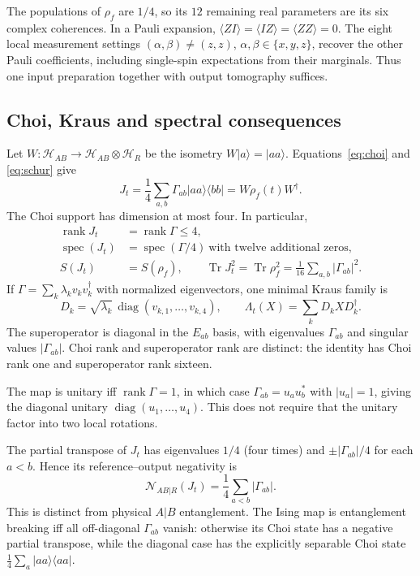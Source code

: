 \documentclass[11pt,a4paper]{article}
\newcommand{\ket}[1]{\lvert #1\rangle}
\newcommand{\bra}[1]{\langle #1\rvert}
\newcommand{\Tr}{\operatorname{Tr}}
\newcommand{\diag}{\operatorname{diag}}
\newcommand{\rank}{\operatorname{rank}}
\newcommand{\spec}{\operatorname{spec}}
\newcommand{\HH}{\mathcal H}
\begin{document}
The populations of $\rho_f$ are $1/4$, so its $12$ remaining real
parameters are its six complex coherences. In a Pauli expansion,
$\langle ZI\rangle=\langle IZ\rangle=\langle ZZ\rangle=0$.
The eight local measurement settings $(\alpha,\beta)\ne(z,z)$,
$\alpha,\beta\in\{x,y,z\}$, recover the other Pauli coefficients,
including single-spin expectations from their marginals. Thus one
input preparation together with output tomography suffices.

\subsection{Choi, Kraus and spectral consequences}

Let $W:\HH_{AB}\to\HH_{AB}\otimes\HH_R$ be the isometry
$W\ket a=\ket{aa}$. Equations~\eqref{eq:choi} and \eqref{eq:schur} give
\begin{equation}
 J_t=\frac14\sum_{a,b}\Gamma_{ab}\ket{aa}\bra{bb}
     =W\rho_f(t)W^\dagger.
 \label{eq:choizz}
\end{equation}
The Choi support has dimension at most four. In particular,
\begin{align}
 \rank J_t&=\rank\Gamma\le4,\\
 \spec(J_t)&=\spec(\Gamma/4)\ \text{with twelve additional zeros},\\
 S(J_t)&=S(\rho_f),\qquad
 \Tr J_t^2=\Tr\rho_f^2=\frac1{16}\sum_{a,b}|\Gamma_{ab}|^2.
 \label{eq:choipurity}
\end{align}
If $\Gamma=\sum_k\lambda_kv_kv_k^\dagger$ with normalized eigenvectors,
one minimal Kraus family is
\begin{equation}
 D_k=\sqrt{\lambda_k}\,\diag(v_{k,1},\ldots,v_{k,4}),
 \qquad \Lambda_t(X)=\sum_k D_kXD_k^\dagger.
\end{equation}
The superoperator is diagonal in the $E_{ab}$ basis, with eigenvalues
$\Gamma_{ab}$ and singular values $|\Gamma_{ab}|$. Choi rank and
superoperator rank are distinct: the identity has Choi rank one and
superoperator rank sixteen.

The map is unitary iff $\rank\Gamma=1$, in which case
$\Gamma_{ab}=u_au_b^*$ with $|u_a|=1$, giving the diagonal unitary
$\diag(u_1,\ldots,u_4)$. This does not require that the unitary factor
into two local rotations.

The partial transpose of $J_t$ has eigenvalues $1/4$ (four times) and
$\pm|\Gamma_{ab}|/4$ for each $a<b$. Hence its reference--output
negativity is
\begin{equation}
 \mathcal N_{AB|R}(J_t)=\frac14\sum_{a<b}|\Gamma_{ab}|.
\end{equation}
This is distinct from physical $A|B$ entanglement. The Ising map is
entanglement breaking iff all off-diagonal $\Gamma_{ab}$ vanish:
otherwise its Choi state has a negative partial transpose, while the
diagonal case has the explicitly separable Choi state
$\frac14\sum_a\ket{aa}\bra{aa}$.
\end{document}
